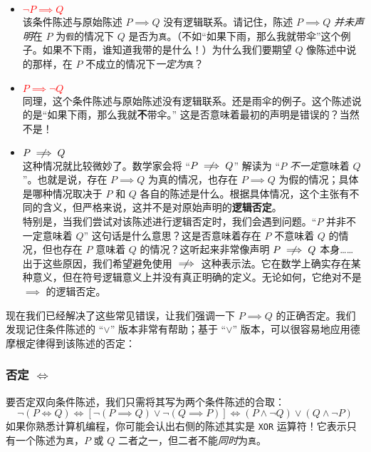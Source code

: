 \begin{itemize}
    \item \textcolor{red}{$\neg P \implies Q$} \\
        该条件陈述与原始陈述 $P \implies Q$ 没有逻辑联系。请记住，陈述 $P \implies Q$ \emph{并未声明}在 $P$ 为\verb|假|的情况下 $Q$ 是否为\verb|真|。（不如``如果下雨，那么我就带伞''这个例子。如果不下雨，谁知道我带的是什么！）为什么我们要期望 $Q$ 像陈述中说的那样，在 $P$ 不成立的情况下\emph{一定为}\verb|真|？
    \item \textcolor{red}{$P \implies \neg Q$} \\
        同理，这个条件陈述与原始陈述没有逻辑联系。还是雨伞的例子。这个陈述说的是``如果下雨，那么我就\textbf{不}带伞。'' 这是否意味着最初的声明是错误的？当然不是！
    \item \textcolor{red}{$P \notimplies Q$} \\
        这种情况就比较微妙了。数学家会将 ``$P \notimplies Q$'' 解读为 ``$P$ \emph{不一定}意味着 $Q$''。也就是说，存在 $P \implies Q$ 为真的情况，也存在 $P \implies Q$ 为假的情况；具体是哪种情况取决于 $P$ 和 $Q$ 各自的陈述是什么。根据具体情况，这个主张有不同的含义，但严格来说，这并不是对原始声明的\textbf{逻辑否定}。\\
        \newline
        特别是，当我们尝试对该陈述进行逻辑否定时，我们会遇到问题。``$P$ 并非不一定意味着 $Q$'' 这句话是什么意思？这是否意味着存在 $P$ 不意味着 $Q$ 的情况，但也存在 $P$ 意味着 $Q$ 的情况？这听起来非常像声明 $P \notimplies Q$ 本身…… \\
        \newline
        出于这些原因，我们希望避免使用 $\notimplies$ 这种表示法。它在数学上确实存在某种意义，但在符号逻辑意义上并没有真正明确的定义。无论如何，它绝对不是 $\implies$ 的逻辑否定。
\end{itemize}
现在我们已经解决了这些常见错误，让我们强调一下 $P \implies Q$ 的正确否定。我们发现记住条件陈述的 ``$\lor$'' 版本非常有帮助；基于 ``$\lor$'' 版本，可以很容易地应用德摩根定律得到该陈述的否定：\\
\newline
{}

\subsubsection*{否定 $\iff$}

要否定双向条件陈述，我们只需将其写为两个条件陈述的合取：
\[\neg (P \iff Q) \iff [\neg (P \implies Q) \lor \neg (Q \implies P)] \iff (P \land \neg Q) \lor (Q \land \neg P)\]
如果你熟悉计算机编程，你可能会认出右侧的陈述其实是 \verb|XOR| 运算符！它表示只有一个陈述为\verb|真|，$P$ 或 $Q$ 二者之一，但二者不能\emph{同时}为\verb|真|。

